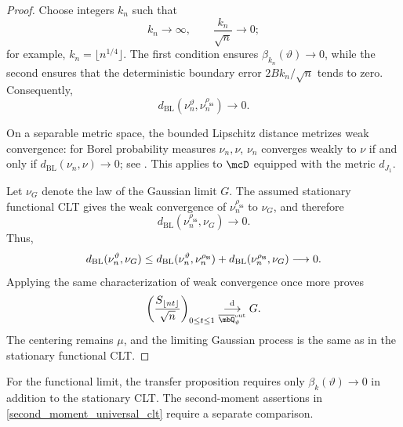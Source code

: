 \documentclass[a4paper]{article}
\numberwithin{equation}{section}   %
\theoremstyle{plain}   %
\theoremstyle{plain}   %
\theoremstyle{examplestyle}
\newcommand{\s}{\rho_{\mathsf{ss}}}     %
\begin{document}
\begin{proof}
    Choose integers $k_n$ such that
    \[
        k_n\longrightarrow\infty,
        \qquad
        \frac{k_n}{\sqrt n}\longrightarrow0;
    \]
    for example, $k_n=\lfloor n^{1/4}\rfloor$.
    The first condition ensures $\beta_{k_n}(\vartheta)\to0$, while the second ensures that the deterministic boundary error $2Bk_n/\sqrt n$ tends to zero. 
    Consequently,
    \[
        d_{\mathrm{BL}}(\nu_n^\vartheta,\nu_n^{\s})
        \longrightarrow0.
    \]
    
    On a separable metric space, the bounded Lipschitz distance metrizes weak convergence: for Borel probability measures $\nu_n,\nu$, $\nu_n$ converges weakly to $\nu$ if and only if $d_{\mathrm{BL}}(\nu_n,\nu)\to 0$; see \cite[Theorem~11.3.3]{Dudley_2002}.
    This applies to $\mcD$ equipped with the metric $d_{J_1}$.
    
    Let $\nu_G$ denote the law of the Gaussian limit $G$. 
    The assumed stationary functional CLT gives the weak convergence of $\nu_n^{\s}$ to $\nu_G$, and therefore
    \[
        d_{\mathrm{BL}}(\nu_n^{\s},\nu_G)
        \longrightarrow0.
    \]
    Thus,
    \[
        d_{\mathrm{BL}}(\nu_n^\vartheta,\nu_G)
        \le
        d_{\mathrm{BL}}(\nu_n^\vartheta,\nu_n^{\s})
        +d_{\mathrm{BL}}(\nu_n^{\s},\nu_G)\\
        \longrightarrow0.
    \]
    Applying the same characterization of weak convergence once more proves
    \[
        \left(
            \frac{S_{\lfloor nt\rfloor}}{\sqrt n}
        \right)_{0\le t\le1}
        \underset{\overline\mbQ^{\mathrm{out}}_\vartheta}
            {\overset{\mathrm d}{\longrightarrow}}
        G.
    \]
    The centering remains $\mu$, and the limiting Gaussian process is the same as in the stationary functional CLT.
\end{proof}

For the functional limit, the transfer proposition requires only $\beta_k(\vartheta)\to0$ in addition to the stationary CLT. The second-moment assertions in \ref{second_moment_universal_clt} require a separate comparison. 
\end{document}
